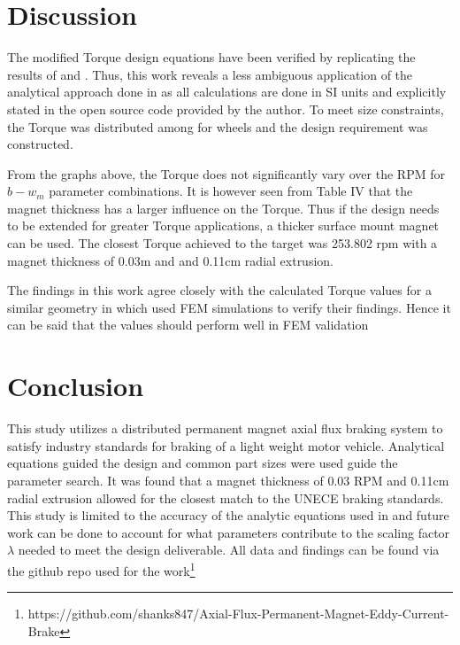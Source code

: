 \documentclass[lettersize,journal]{IEEEtran}
\begin{document}
\section{Discussion}
The modified Torque design equations have been verified by replicating the results of \cite{fontchastagner_2018_design} and \cite{gay_2006_parametric}. Thus, this work reveals a less ambiguous application of the analytical approach done in \cite{Lu2021-lr} as all calculations are done in SI units and explicitly stated in the open source code provided by the author. To meet size constraints, the Torque was distributed among for wheels and the design requirement was constructed. 

From the graphs above, the Torque does not significantly vary over the RPM for $b-w_m$ parameter combinations. It is however seen from Table IV that the magnet thickness has a larger influence on the Torque. Thus if the design needs to be extended for greater Torque applications, a thicker surface mount magnet can be used. The closest Torque achieved to the target was 253.802 rpm with a magnet thickness of 0.03m and and 0.11cm radial extrusion.

The findings in this work agree closely with the calculated Torque values for a similar geometry in \cite{gay_2006_parametric} which used FEM simulations to verify their findings. Hence it can be said that the values should perform well in FEM validation

\section{Conclusion}
This study utilizes a distributed permanent magnet axial flux braking system to satisfy industry standards for braking of a light weight motor vehicle. Analytical equations guided the design and common part sizes were used guide the parameter search. It was found that a magnet thickness of 0.03 RPM and 0.11cm radial extrusion allowed for the closest match to the UNECE braking standards. This study is limited to the accuracy of the analytic equations used in \cite{Lu2021-lr} and  future work can be done to account for what parameters contribute to the scaling factor $\lambda$ needed to meet the design deliverable. All data and findings can be found via the github repo used for the work\footnote{https://github.com/shanks847/Axial-Flux-Permanent-Magnet-Eddy-Current-Brake}
\end{document}
